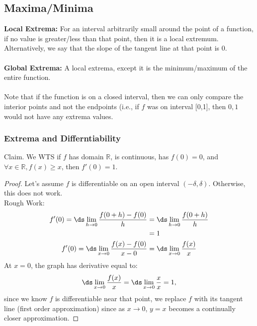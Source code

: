 \documentclass{article}
\begin{document}
\subsection{Maxima/Minima}
\textbf{Local Extrema: }For an interval arbitrarily small around the point of a function, if no value is greater/less than that point, then it is a local extremum.\\
Alternatively, we say that the slope of the tangent line at that point is $0$.\\
\\
\textbf{Global Extrema: }A local extrema, except it is the minimum/maximum of the entire function.\\
\\
Note that if the function is on a closed interval, then we can only compare the interior points and not the endpoints (i.e., if $f$ was on interval [0,1], then $0,1$ would not have any extrema values.
\subsubsection{Extrema and Differntiability}

Claim. We WTS if $f$ has domain $\mathbb{R}$, is continuous, has $f(0) = 0$, and $\forall x  \in \mathbb{R}, f(x) \geq x$, then $f'(0) = 1$.
\begin{proof}
Let's assume $f$ is differentiable on an open interval $(-\delta, \delta)$. Otherwise, this does not work.\\
Rough Work:
\begin{align*}
    f'(0) = \ds \lim_{h \to 0} \frac{f(0 + h) - f(0)}{h} & = \ds \lim_{h \to 0} \frac{f(0+h)}{h}\\
    & = 1\\
    f'(0) = \ds \lim_{x \to 0} \frac{f(x) - f(0)}{x - 0} & = \ds \lim_{x \to 0} \frac{f(x)}{x}
\end{align*}
At $x = 0$, the graph has derivative equal to: 
$$\ds \lim_{x \to 0}\frac{f(x)}{x} = \ds \lim_{x \to 0} \frac{x}{x} = 1,$$ 
since we know $f$ is differentiable near that point, we replace $f$ with its tangent line (first order approximation) since as $x \to 0$, $y = x$ becomes a continually closer approximation.
\end{proof}
\end{document}
